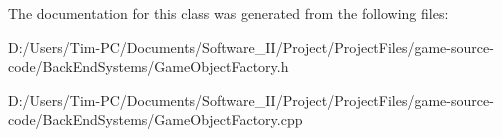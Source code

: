 The documentation for this class was generated from the following files\+:\begin{DoxyCompactItemize}
\item 
D\+:/\+Users/\+Tim-\/\+P\+C/\+Documents/\+Software\+\_\+\+I\+I/\+Project/\+Project\+Files/game-\/source-\/code/\+Back\+End\+Systems/Game\+Object\+Factory.\+h\item 
D\+:/\+Users/\+Tim-\/\+P\+C/\+Documents/\+Software\+\_\+\+I\+I/\+Project/\+Project\+Files/game-\/source-\/code/\+Back\+End\+Systems/Game\+Object\+Factory.\+cpp\end{DoxyCompactItemize}
